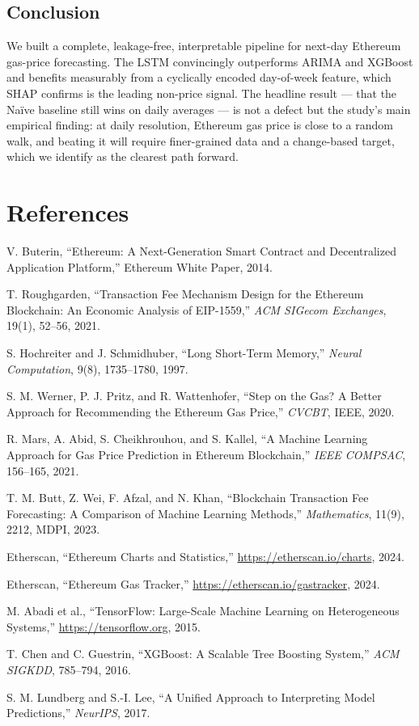 \documentclass[11pt,a4paper]{article}
\begin{document}
\subsection{Conclusion}
We built a complete, leakage-free, interpretable pipeline for next-day Ethereum gas-price
forecasting. The LSTM convincingly outperforms ARIMA and XGBoost and benefits measurably from a
cyclically encoded day-of-week feature, which SHAP confirms is the leading non-price signal. The
headline result --- that the Na\"ive baseline still wins on daily averages --- is not a defect but
the study's main empirical finding: at daily resolution, Ethereum gas price is close to a random
walk, and beating it will require finer-grained data and a change-based target, which we identify
as the clearest path forward.

\section*{References}
\begin{enumerate}[leftmargin=2.2em,label={[\arabic*]}]
\item V. Buterin, ``Ethereum: A Next-Generation Smart Contract and Decentralized Application
Platform,'' Ethereum White Paper, 2014.
\item T. Roughgarden, ``Transaction Fee Mechanism Design for the Ethereum Blockchain: An Economic
Analysis of EIP-1559,'' \emph{ACM SIGecom Exchanges}, 19(1), 52--56, 2021.
\item S. Hochreiter and J. Schmidhuber, ``Long Short-Term Memory,'' \emph{Neural Computation},
9(8), 1735--1780, 1997.
\item S. M. Werner, P. J. Pritz, and R. Wattenhofer, ``Step on the Gas? A Better Approach for
Recommending the Ethereum Gas Price,'' \emph{CVCBT}, IEEE, 2020.
\item R. Mars, A. Abid, S. Cheikhrouhou, and S. Kallel, ``A Machine Learning Approach for Gas
Price Prediction in Ethereum Blockchain,'' \emph{IEEE COMPSAC}, 156--165, 2021.
\item T. M. Butt, Z. Wei, F. Afzal, and N. Khan, ``Blockchain Transaction Fee Forecasting: A
Comparison of Machine Learning Methods,'' \emph{Mathematics}, 11(9), 2212, MDPI, 2023.
\item Etherscan, ``Ethereum Charts and Statistics,'' \url{https://etherscan.io/charts}, 2024.
\item Etherscan, ``Ethereum Gas Tracker,'' \url{https://etherscan.io/gastracker}, 2024.
\item M. Abadi et al., ``TensorFlow: Large-Scale Machine Learning on Heterogeneous Systems,''
\url{https://tensorflow.org}, 2015.
\item T. Chen and C. Guestrin, ``XGBoost: A Scalable Tree Boosting System,'' \emph{ACM SIGKDD},
785--794, 2016.
\item S. M. Lundberg and S.-I. Lee, ``A Unified Approach to Interpreting Model Predictions,''
\emph{NeurIPS}, 2017.
\end{enumerate}
\end{document}
